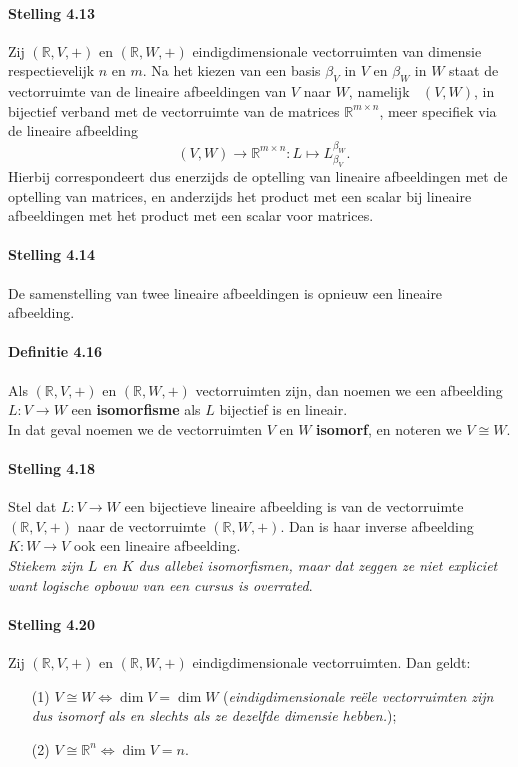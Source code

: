 \documentclass[11pt,oneside,a4paper]{article}
\DeclareMathOperator{\rhom}{Hom_\mathbb{R}}
\begin{document}
	\paragraph{Stelling 4.13}
			Zij $(\mathbb{R}, V, +)$ en $(\mathbb{R}, W, +)$ eindigdimensionale vectorruimten van dimensie respectievelijk $n$ en $m$. Na het kiezen van een basis $\beta_V$ in $V$ en $\beta_W$ in $W$ staat de vectorruimte van de lineaire afbeeldingen van $V$ naar $W$, namelijk $\rhom(V,W)$, in bijectief verband met de vectorruimte van de matrices $\mathbb{R}^{m\times n}$, meer specifiek via de lineaire afbeelding $$\rhom(V,W) \to \mathbb{R}^{m\times n}: L \mapsto L_{\beta_V}^{\beta_W}.$$ Hierbij correspondeert dus enerzijds de optelling van lineaire afbeeldingen met de optelling van matrices, en anderzijds het product met een scalar bij lineaire afbeeldingen met het product met een scalar voor matrices.
	\paragraph{Stelling 4.14}
		De samenstelling van twee lineaire afbeeldingen is opnieuw een lineaire afbeelding.
	\paragraph{Definitie 4.16}
		Als $(\mathbb{R}, V, +)$ en $(\mathbb{R}, W, +)$ vectorruimten zijn, dan noemen we een afbeelding $L: V \to W$ een \textbf{isomorfisme} als $L$ bijectief is en lineair. \\ In dat geval noemen we de vectorruimten $V$ en $W$ \textbf{isomorf}, en noteren we $V \cong W$.
	\paragraph{Stelling 4.18}
		Stel dat $L: V \to W$ een bijectieve lineaire afbeelding is van de vectorruimte $(\mathbb{R}, V, +)$ naar de vectorruimte $(\mathbb{R}, W, +)$. Dan is haar inverse afbeelding $K: W \to V$ ook een lineaire afbeelding. \\ \textit{Stiekem zijn $L$ en $K$ dus allebei isomorfismen, maar dat zeggen ze niet expliciet want logische opbouw van een cursus is overrated}.
	\paragraph{Stelling 4.20}
		Zij $(\mathbb{R}, V, +)$ en $(\mathbb{R}, W, +)$ eindigdimensionale vectorruimten. Dan geldt:
		\begin{itemize}
			\item[(1)] $V \cong W \Leftrightarrow \dim V = \dim W$ (\textit{eindigdimensionale reële vectorruimten zijn dus isomorf als en slechts als ze dezelfde dimensie hebben.});
			\item[(2)] $V \cong \mathbb{R}^n \Leftrightarrow \dim V = n$. 
		\end{itemize}
\end{document}
